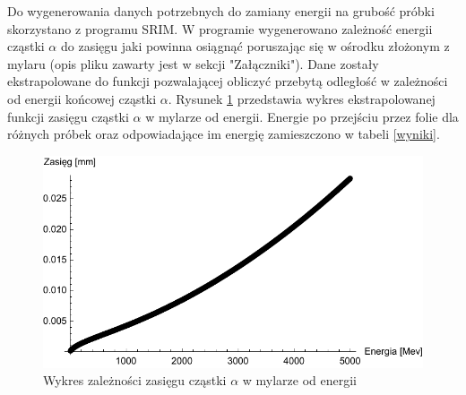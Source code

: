 \documentclass[12pt,a4paper]{article}
\begin{document}
Do wygenerowania danych potrzebnych do zamiany energii na grubość próbki skorzystano z programu SRIM. W programie wygenerowano zależność energii cząstki $\alpha$ do zasięgu jaki powinna osiągnąć poruszając się w ośrodku złożonym z mylaru (opis pliku zawarty jest w sekcji "Załączniki"). Dane zostały ekstrapolowane do funkcji pozwalającej obliczyć przebytą odległość w zależności od energii końcowej cząstki $\alpha$. Rysunek \ref{energia_zasieg} przedstawia wykres ekstrapolowanej funkcji zasięgu cząstki $\alpha$ w mylarze od energii. Energie po przejściu przez folie dla różnych próbek oraz odpowiadające im energię zamieszczono w tabeli \ref{wyniki}. 

\begin{figure}[H]
\centering
\includegraphics[scale=0.9]{energia_zasieg.pdf}
\caption{Wykres zależności zasięgu cząstki $\alpha$ w mylarze od energii}
\label{energia_zasieg}
\end{figure}
\end{document}
